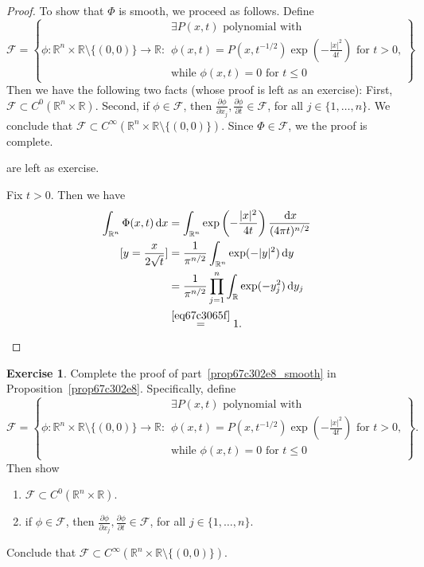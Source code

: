\documentclass[a4paper,9pt]{amsart}
\newcommand{\scr}[1]{\mathscr{#1}}
\newcommand{\R}{\mathbb{R}}	%
\newcommand{\did}{\,\mathrm{d}}	%
\newcommand{\de}{\partial}		%
\theoremstyle{plain}
\theoremstyle{definition}
\newtheorem{exercise}[proposition]{Exercise}%
\theoremstyle{remark}
\begin{document}
\begin{proof}
	To show that $\Phi$ is smooth, we proceed as follows.
	Define
	\begin{equation*}
		\scr F = \left\{ 
			\phi:\R^n\times\R\setminus\{(0,0)\} \to \R :
			\begin{array}{l}
			\exists P(x,t) \text{ polynomial with }\\
			\phi(x,t) = P(x,t^{-1/2})\exp\left( -\frac{|x|^2}{4t} \right)\text{ for $t>0$,}\\
			\text{while $\phi(x,t)=0$ for $t\le 0$}
			\end{array}
		\right\}
	\end{equation*}
	Then we have the following two facts (whose proof is left as an exercise):
	First, $\scr F\subset C^0(\R^n\times\R)$.
	Second, if $\phi\in\scr F$, then $\frac{\de\phi}{\de x_j},\frac{\de\phi}{\de t}\in\scr F$, for all $j\in\{1,\dots,n\}$.
	We conclude that $\scr F\subset C^\infty(\R^n\times\R\setminus\{(0,0)\})$.
	Since $\Phi\in\scr F$, we the proof is complete.
	
	are left as exercise.
	
	Fix $t>0$. Then we have
	\begin{align*}
		\int_{\R^n} \Phi(x,t) \did x
		&= \int_{\R^n} \exp\left( -\frac{|x|^2}{4t} \right) \frac{\did x}{(4\pi t)^{n/2}} \\
		[y=\frac{x}{2\sqrt{t}}]
		&= \frac1{\pi^{n/2}} \int_{\R^n} \exp(-|y|^2) \did y \\
		&= \frac1{\pi^{n/2}} \prod_{j=1}^n \int_\R \exp(-y_j^2) \did y_j \\
		&\overset{\eqref{eq67c3065f}}= 1 .
	\end{align*}
	
\end{proof}

\begin{exercise}
	Complete the proof of part~\ref{prop67c302e8_smooth} in Proposition~\ref{prop67c302e8}.
	Specifically, define
	\begin{equation*}
		\scr F = \left\{ 
			\phi:\R^n\times\R\setminus\{(0,0)\} \to \R :
			\begin{array}{l}
			\exists P(x,t) \text{ polynomial with }\\
			\phi(x,t) = P(x,t^{-1/2})\exp\left( -\frac{|x|^2}{4t} \right)\text{ for $t>0$,}\\
			\text{while $\phi(x,t)=0$ for $t\le 0$}
			\end{array}
		\right\} .
	\end{equation*}
	Then show
	\begin{enumerate}
	\item	$\scr F\subset C^0(\R^n\times\R)$.
	\item if $\phi\in\scr F$, then $\frac{\de\phi}{\de x_j},\frac{\de\phi}{\de t}\in\scr F$, for all $j\in\{1,\dots,n\}$.
	\end{enumerate}
	Conclude that $\scr F\subset C^\infty(\R^n\times\R\setminus\{(0,0)\})$.
\end{exercise}
\end{document}
